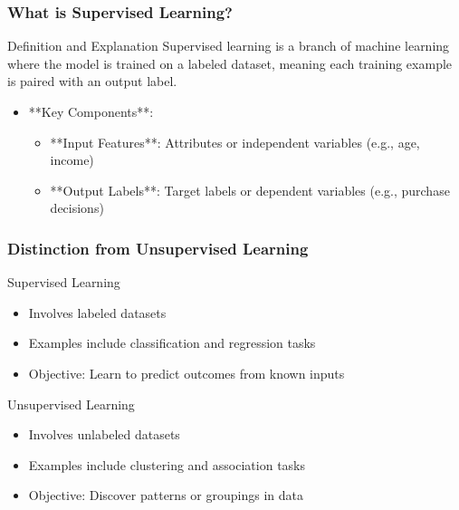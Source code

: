 \documentclass[aspectratio=169]{beamer}
\begin{document}
\begin{frame}[fragile]
    \frametitle{What is Supervised Learning?}
    \begin{block}{Definition and Explanation}
        Supervised learning is a branch of machine learning where the model is trained on a labeled dataset, meaning each training example is paired with an output label. 
    \end{block}
    \begin{itemize}
        \item **Key Components**:
        \begin{itemize}
            \item **Input Features**: Attributes or independent variables (e.g., age, income)
            \item **Output Labels**: Target labels or dependent variables (e.g., purchase decisions)
        \end{itemize}
    \end{itemize}
\end{frame}

\begin{frame}[fragile]
    \frametitle{Distinction from Unsupervised Learning}
    \begin{block}{Supervised Learning}
        \begin{itemize}
            \item Involves labeled datasets
            \item Examples include classification and regression tasks
            \item Objective: Learn to predict outcomes from known inputs
        \end{itemize}
    \end{block}
    \begin{block}{Unsupervised Learning}
        \begin{itemize}
            \item Involves unlabeled datasets
            \item Examples include clustering and association tasks
            \item Objective: Discover patterns or groupings in data
        \end{itemize}
    \end{block}
\end{frame}
\end{document}
